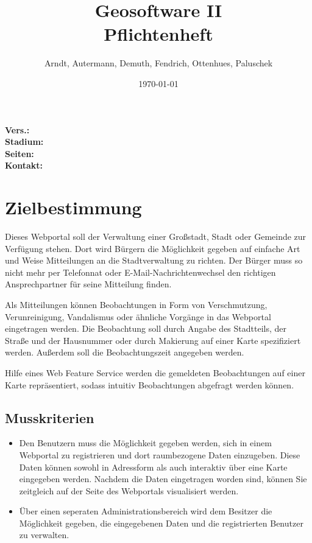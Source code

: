 \documentclass[a4paper,11pt]{scrartcl}
\begin{document}
\title{Geosoftware II \\ \small Pflichtenheft}
\author{Arndt, Autermann, Demuth, Fendrich, Ottenhues, Paluschek}
\date{\today}
\maketitle
\thispagestyle{empty}

\begin{center}
\bf Vers.: \MyVersion \\
\bf Stadium: \MyStatus\\
\bf Seiten: \thelastpage \\
\bf Kontakt: \email \\
\end{center}
\newpage

\tableofcontents

\newpage

\section{Zielbestimmung}
	Dieses Webportal soll der Verwaltung einer Großstadt, Stadt oder Gemeinde zur Verfügung stehen. Dort wird Bürgern die Möglichkeit gegeben auf einfache Art und Weise Mitteilungen an die Stadtverwaltung zu richten. Der Bürger muss so nicht mehr per Telefonnat oder E-Mail-Nachrichtenwechsel den richtigen Ansprechpartner für seine Mitteilung  finden. 

	Als Mitteilungen können Beobachtungen in Form von Verschmutzung, Verunreinigung, Vandalismus oder ähnliche Vorgänge in das Webportal eingetragen werden. Die Beobachtung soll durch Angabe des Stadtteils, der Straße und der Hausnummer oder durch Makierung auf einer Karte spezifiziert werden. Außerdem soll die Beobachtungszeit angegeben werden.

	Hilfe eines Web Feature Service werden die gemeldeten Beobachtungen auf einer Karte repräsentiert, sodass intuitiv Beobachtungen abgefragt werden können.
	\subsection{Musskriterien}
		\begin{itemize}
			\item Den Benutzern muss die Möglichkeit gegeben werden, sich in einem Webportal zu registrieren und dort raumbezogene Daten einzugeben. Diese Daten können sowohl in Adressform als auch interaktiv über eine Karte eingegeben werden. Nachdem die Daten eingetragen worden sind, können Sie zeitgleich auf der Seite des Webportals visualisiert werden.
	            \item Über einen seperaten Administrationsbereich wird dem Besitzer die Möglichkeit gegeben, die eingegebenen Daten und die registrierten Benutzer zu verwalten. 
		\end{itemize}
\end{document}
